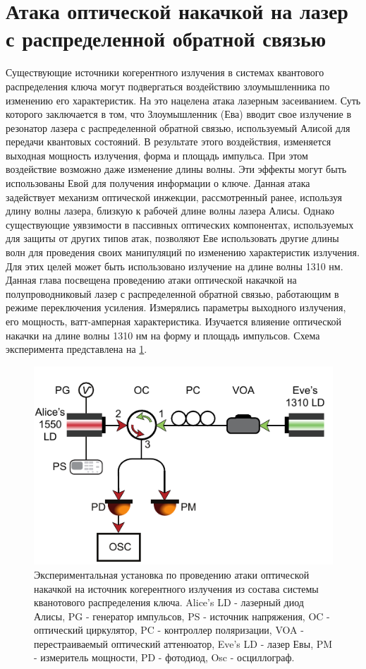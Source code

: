 \section{Атака оптической накачкой на лазер с распределенной обратной связью}\label{sec:ch4/sec1}
Существующие источники когерентного излучения в системах квантового распределения ключа могут подвергаться воздействию злоумышленника по изменению его характеристик. На это нацелена атака лазерным засеиванием. Суть которого заключается в том, что Злоумышленник (Ева) вводит свое излучение в резонатор лазера с распределенной обратной связью, используемый Алисой для передачи квантовых состояний. В результате этого воздействия, изменяется выходная мощность излучения, форма и площадь импульса. При этом воздействие возможно даже изменение длины волны. Эти эффекты могут быть использованы Евой для получения информации о ключе.
Данная атака задействует механизм оптической инжекции, рассмотренный ранее, используя длину волны лазера, близкую к рабочей длине волны лазера Алисы.
\newline Однако существующие уявзимости в пассивных оптических компонентах, используемых для защиты от других типов атак, позволяют Еве использовать другие длины волн для проведения своих манипуляций по изменению характеристик излучения. Для этих целей может быть использовано излучение на длине волны 1310 нм. Данная глава посвещена проведению атаки оптической накачкой на полупроводниковый лазер с распределенной обратной связью, работающим в режиме переключения усиления. Измерялись параметры выходного излучения, его мощность, ватт-амперная характеристика. Изучается влияение оптической накачки на длине волны 1310 нм на форму и площадь импульсов. 
Схема эксперимента представлена на \ref{fig:ch4 1310 exp}.
\begin{figure}
    \centering
    \includegraphics{images/1310 experiment (3).pdf}
    \caption{Экспериментальная установка по проведению атаки оптической накачкой на источник когерентного излучения из состава системы кванотового распределения ключа. Alice's LD - лазерный диод Алисы, PG - генератор импульсов, PS - источник напряжения, OC - оптический циркулятор, PC - контроллер поляризации, VOA - перестраиваемый оптический аттенюатор, Eve's LD - лазер Евы, PM - измеритель мощности, PD - фотодиод, Osc - осциллограф.}
    \label{fig:ch4 1310 exp}
\end{figure}
